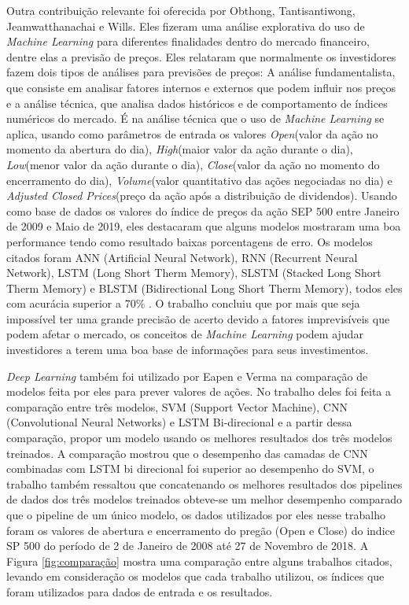 Outra contribuição relevante foi oferecida por Obthong, Tantisantiwong, Jeamwatthanachai e Wills\cite{Obthong2020}. Eles fizeram uma análise explorativa do uso de \textit{Machine Learning} para diferentes finalidades dentro do mercado financeiro, dentre elas a previsão de preços. Eles relataram que normalmente os investidores fazem dois tipos de análises para previsões de preços: A análise fundamentalista, que consiste em analisar fatores internos e externos que podem influir nos preços e a análise técnica, que analisa dados históricos e de comportamento de índices numéricos do mercado. É na análise técnica que o uso de \textit{Machine Learning} se aplica, usando como parâmetros de entrada os valores \textit{Open}(valor da ação no momento da abertura do dia), \textit{High}(maior valor da ação durante o dia), \textit{Low}(menor valor da ação durante o dia), \textit{Close}(valor da ação no momento do encerramento do dia), \textit{Volume}(valor quantitativo das ações negociadas no dia) e \textit{Adjusted Closed Prices}(preço da ação após a distribuição de dividendos). Usando como base de dados os valores do índice de preços da ação SEP 500 entre Janeiro de 2009 e Maio de 2019, eles destacaram que alguns modelos mostraram uma boa performance tendo como resultado baixas porcentagens de erro. Os modelos citados foram ANN (Artificial Neural Network), RNN (Recurrent Neural Network), LSTM (Long Short Therm Memory), SLSTM (Stacked Long Short Therm Memory) e BLSTM (Bidirectional Long Short Therm Memory), todos eles com acurácia superior a 70\% . O trabalho concluiu que por mais que seja impossível ter uma grande precisão de acerto devido a fatores imprevisíveis que podem afetar o mercado, os conceitos de \textit{Machine Learning} podem ajudar investidores a terem uma boa base de informações para seus investimentos.

\textit{Deep Learning} também foi utilizado por Eapen e Verma \cite{Eapen2019} na comparação de modelos feita por eles para prever valores de ações. No trabalho deles foi feita a comparação entre três modelos, SVM (Support Vector Machine), CNN (Convolutional Neural Networks) e LSTM Bi-direcional e a partir dessa comparação, propor um modelo usando os melhores resultados dos três modelos treinados. A comparação mostrou que o desempenho das camadas de CNN combinadas com LSTM bi direcional foi superior ao desempenho do SVM, o trabalho também ressaltou que concatenando os melhores resultados dos pipelines de dados dos três modelos treinados obteve-se um melhor desempenho comparado que o pipeline de um único modelo, os dados utilizados por eles nesse trabalho foram os valores de abertura e encerramento do pregão (Open e Close) do indice SP 500 do período de 2 de Janeiro de 2008 até 27 de Novembro de 2018. A Figura \ref{fig:comparação} mostra uma comparação entre alguns trabalhos citados, levando em consideração os modelos que cada trabalho utilizou, os índices que foram utilizados para dados de entrada e os resultados.

